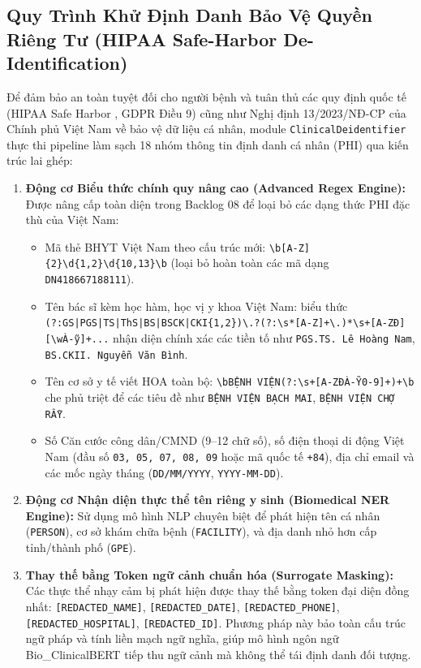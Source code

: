 \subsection{Quy Trình Khử Định Danh Bảo Vệ Quyền Riêng Tư (HIPAA Safe-Harbor De-Identification)}
Để đảm bảo an toàn tuyệt đối cho người bệnh và tuân thủ các quy định quốc tế (HIPAA Safe Harbor \cite{hhs2012hipaa}, GDPR Điều 9) cũng như Nghị định 13/2023/NĐ-CP của Chính phủ Việt Nam về bảo vệ dữ liệu cá nhân, module \texttt{ClinicalDeidentifier} thực thi pipeline làm sạch 18 nhóm thông tin định danh cá nhân (PHI) qua kiến trúc lai ghép:
\begin{enumerate}[leftmargin=1.8em, itemsep=0.2em]
    \item \textbf{Động cơ Biểu thức chính quy nâng cao (Advanced Regex Engine):} Được nâng cấp toàn diện trong Backlog 08 để loại bỏ các dạng thức PHI đặc thù của Việt Nam:
    \begin{itemize}[leftmargin=1.5em, itemsep=0.1em]
        \item Mã thẻ BHYT Việt Nam theo cấu trúc mới: \texttt{\textbackslash b[A-Z]\{2\}\textbackslash d\{1,2\}\textbackslash d\{10,13\}\textbackslash b} (loại bỏ hoàn toàn các mã dạng \texttt{DN418667188111}).
        \item Tên bác sĩ kèm học hàm, học vị y khoa Việt Nam: biểu thức \texttt{(?:GS|PGS|TS|ThS|BS|BSCK|CKI\{1,2\})\textbackslash.?(?:\textbackslash s*[A-Z]+\textbackslash.)*\textbackslash s+[A-ZĐ][\textbackslash wÀ-ỹ]+...} nhận diện chính xác các tiền tố như \texttt{PGS.TS. Lê Hoàng Nam}, \texttt{BS.CKII. Nguyễn Văn Bình}.
        \item Tên cơ sở y tế viết HOA toàn bộ: \texttt{\textbackslash bBỆNH VIỆN(?:\textbackslash s+[A-ZĐÀ-Ỹ0-9]+)+\textbackslash b} che phủ triệt để các tiêu đề như \texttt{BỆNH VIỆN BẠCH MAI}, \texttt{BỆNH VIỆN CHỢ RẪY}.
        \item Số Căn cước công dân/CMND (9--12 chữ số), số điện thoại di động Việt Nam (đầu số \texttt{03, 05, 07, 08, 09} hoặc mã quốc tế \texttt{+84}), địa chỉ email và các mốc ngày tháng (\texttt{DD/MM/YYYY}, \texttt{YYYY-MM-DD}).
    \end{itemize}
    \item \textbf{Động cơ Nhận diện thực thể tên riêng y sinh (Biomedical NER Engine):} Sử dụng mô hình NLP chuyên biệt để phát hiện tên cá nhân (\texttt{PERSON}), cơ sở khám chữa bệnh (\texttt{FACILITY}), và địa danh nhỏ hơn cấp tỉnh/thành phố (\texttt{GPE}).
    \item \textbf{Thay thế bằng Token ngữ cảnh chuẩn hóa (Surrogate Masking):} Các thực thể nhạy cảm bị phát hiện được thay thế bằng token đại diện đồng nhất: \texttt{[REDACTED\_NAME]}, \texttt{[REDACTED\_DATE]}, \texttt{[REDACTED\_PHONE]}, \texttt{[REDACTED\_HOSPITAL]}, \texttt{[REDACTED\_ID]}. Phương pháp này bảo toàn cấu trúc ngữ pháp và tính liền mạch ngữ nghĩa, giúp mô hình ngôn ngữ Bio\_ClinicalBERT tiếp thu ngữ cảnh mà không thể tái định danh đối tượng.

\end{enumerate}
